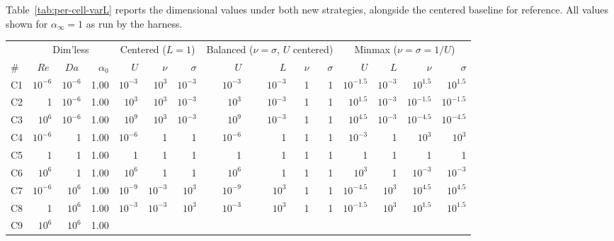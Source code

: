 \documentclass[11pt]{article}
\newcommand{\Reyn}{\operatorname{\mathit{Re}}}
\newcommand{\Damk}{\operatorname{\mathit{Da}}}
\begin{document}
Table~\ref{tab:per-cell-varL} reports the dimensional values under
both new strategies, alongside the centered baseline for reference.
All values shown for $\alpha_\infty = 1$ as run by the harness.

\begin{table}[!htbp]
  \centering
  \footnotesize
  \setlength{\tabcolsep}{3pt}
  \begin{tabular}{l rrr rrr rrrr rrrr}
    \toprule
    & \multicolumn{3}{c}{Dim'less} &
      \multicolumn{3}{c}{Centered ($L=1$)} &
      \multicolumn{4}{c}{Balanced ($\nu = \sigma$, $U$ centered)} &
      \multicolumn{4}{c}{Minmax ($\nu = \sigma = 1/U$)} \\
    \cmidrule(lr){2-4} \cmidrule(lr){5-7} \cmidrule(lr){8-11} \cmidrule(lr){12-15}
    \# & $\Reyn$ & $\Damk$ & $\alpha_0$
       & $U$ & $\nu$ & $\sigma$
       & $U$ & $L$ & $\nu$ & $\sigma$
       & $U$ & $L$ & $\nu$ & $\sigma$ \\
    \midrule
    C1  & $10^{-6}$ & $10^{-6}$ & 1.00
        & $10^{-3}$ & $10^{3}$ & $10^{-3}$
        & $10^{-3}$ & $10^{-3}$ & 1 & 1
        & $10^{-1.5}$ & $10^{-3}$ & $10^{1.5}$ & $10^{1.5}$ \\
    C2  & 1 & $10^{-6}$ & 1.00
        & $10^{3}$ & $10^{3}$ & $10^{-3}$
        & $10^{3}$ & $10^{-3}$ & 1 & 1
        & $10^{1.5}$ & $10^{-3}$ & $10^{-1.5}$ & $10^{-1.5}$ \\
    C3  & $10^{6}$ & $10^{-6}$ & 1.00
        & $10^{9}$ & $10^{3}$ & $10^{-3}$
        & $10^{9}$ & $10^{-3}$ & 1 & 1
        & $10^{4.5}$ & $10^{-3}$ & $10^{-4.5}$ & $10^{-4.5}$ \\
    C4  & $10^{-6}$ & 1 & 1.00
        & $10^{-6}$ & 1 & 1
        & $10^{-6}$ & 1 & 1 & 1
        & $10^{-3}$ & 1 & $10^{3}$ & $10^{3}$ \\
    C5  & 1 & 1 & 1.00
        & 1 & 1 & 1
        & 1 & 1 & 1 & 1
        & 1 & 1 & 1 & 1 \\
    C6  & $10^{6}$ & 1 & 1.00
        & $10^{6}$ & 1 & 1
        & $10^{6}$ & 1 & 1 & 1
        & $10^{3}$ & 1 & $10^{-3}$ & $10^{-3}$ \\
    C7  & $10^{-6}$ & $10^{6}$ & 1.00
        & $10^{-9}$ & $10^{-3}$ & $10^{3}$
        & $10^{-9}$ & $10^{3}$ & 1 & 1
        & $10^{-4.5}$ & $10^{3}$ & $10^{4.5}$ & $10^{4.5}$ \\
    C8  & 1 & $10^{6}$ & 1.00
        & $10^{-3}$ & $10^{-3}$ & $10^{3}$
        & $10^{-3}$ & $10^{3}$ & 1 & 1
        & $10^{-1.5}$ & $10^{3}$ & $10^{1.5}$ & $10^{1.5}$ \\
    C9  & $10^{6}$ & $10^{6}$ & 1.00

\end{tabular}
\end{table}
\end{document}
